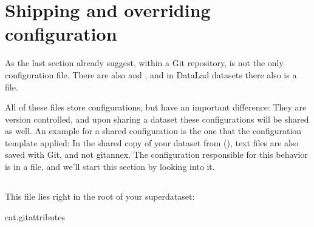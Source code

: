 \sphinxstepscope

\ignorespaces 

\section{Shipping and overriding configuration}
\label{\detokenize{basics/101-123-config2:shipping-and-overriding-configuration}}\label{\detokenize{basics/101-123-config2:config2}}\label{\detokenize{basics/101-123-config2:index-0}}\label{\detokenize{basics/101-123-config2::doc}}
\sphinxAtStartPar
As the last section already suggest, within a Git repository,
 is not the only configuration file.
There are also  and , and in DataLad datasets
there also is a  file.

\sphinxAtStartPar
All of these files store configurations, but have an important difference:
They are version controlled, and upon sharing a dataset these configurations
will be shared as well. An example for a shared configuration
is the one that the  configuration template applied:
In the shared copy of your dataset from {\hyperref[\detokenize{basics/101-121-siblings:sibling}]{}} (), text files are also saved with Git,
and not git\sphinxhyphen{}annex. The configuration responsible
for this behavior is in a  file, and we’ll start this
section by looking into it.

\ignorespaces 

\subsection{}
\label{\detokenize{basics/101-123-config2:gitattributes}}\label{\detokenize{basics/101-123-config2:index-1}}
\sphinxAtStartPar
This file lies right in the root of your superdataset:

\begin{sphinxVerbatim}[commandchars=\\\{\}]
cat.gitattributes
\end{sphinxVerbatim}

